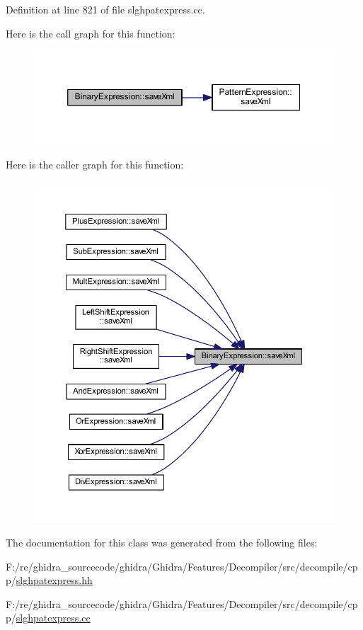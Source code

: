 Definition at line 821 of file slghpatexpress.\+cc.

Here is the call graph for this function\+:
\nopagebreak
\begin{figure}[H]
\begin{center}
\leavevmode
\includegraphics[width=350pt]{class_binary_expression_a4b9e768a619b713d6c1ff35a618d98ec_cgraph}
\end{center}
\end{figure}
Here is the caller graph for this function\+:
\nopagebreak
\begin{figure}[H]
\begin{center}
\leavevmode
\includegraphics[width=350pt]{class_binary_expression_a4b9e768a619b713d6c1ff35a618d98ec_icgraph}
\end{center}
\end{figure}


The documentation for this class was generated from the following files\+:\begin{DoxyCompactItemize}
\item 
F\+:/re/ghidra\+\_\+sourcecode/ghidra/\+Ghidra/\+Features/\+Decompiler/src/decompile/cpp/\mbox{\hyperlink{slghpatexpress_8hh}{slghpatexpress.\+hh}}\item 
F\+:/re/ghidra\+\_\+sourcecode/ghidra/\+Ghidra/\+Features/\+Decompiler/src/decompile/cpp/\mbox{\hyperlink{slghpatexpress_8cc}{slghpatexpress.\+cc}}\end{DoxyCompactItemize}
